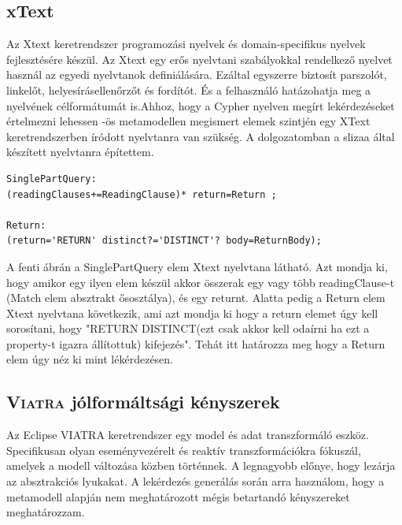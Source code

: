 \subsection{xText}
Az Xtext keretrendszer programozási nyelvek  és  domain-specifikus nyelvek fejlesztésére készül. Az Xtext  
egy erős nyelvtani szabályokkal rendelkező nyelvet használ az egyedi nyelvtanok definiálására. Ezáltal
egyszerre biztosít parszolót, linkelőt, helyesírásellenőrzőt és fordítót. És a felhasználó hatázohatja 
meg a nyelvének célformátumát is.Ahhoz, hogy a Cypher nyelven megírt lekérdezéseket értelmezni lehessen 
-ös metamodellen megismert elemek szintjén egy XText \cite{xText} keretrendszerben
íródott nyelvtanra van szükség. A dolgozatomban a slizaa\cite{slizaa_2018} által készített nyelvtanra építettem.

\begin{lstlisting}
SinglePartQuery:
(readingClauses+=ReadingClause)* return=Return ;

Return:
(return='RETURN' distinct?='DISTINCT'? body=ReturnBody);
\end{lstlisting}



A fenti ábrán a SinglePartQuery elem Xtext nyelvtana látható. Azt mondja ki,
hogy amikor egy ilyen elem készül akkor összerak egy vagy több readingClause-t (Match elem absztrakt ősosztálya),
és egy returnt. Alatta pedig a Return elem Xtext nyelvtana következik, ami azt mondja ki hogy a return
elemet úgy kell sorosítani, hogy "RETURN DISTINCT(ezt csak akkor kell odaírni ha ezt a property-t igazra
állítottuk) kifejezés". Tehát itt határozza meg hogy a Return elem úgy néz ki mint  lékérdezésen.  


\subsection{\textsc{Viatra} jólformáltsági kényszerek}
Az Eclipse VIATRA keretrendszer \cite{viatra} egy model és adat transzformáló eszköz. Specifikusan olyan eseményvezérelt
és reaktív transzformációkra fókuszál, amelyek a modell változása közben történnek. A legnagyobb előnye, 
hogy lezárja az absztrakciós lyukakat. A lekérdezés generálás során arra használom, hogy a metamodell alapján nem 
meghatározott mégis betartandó kényszereket meghatározzam.
